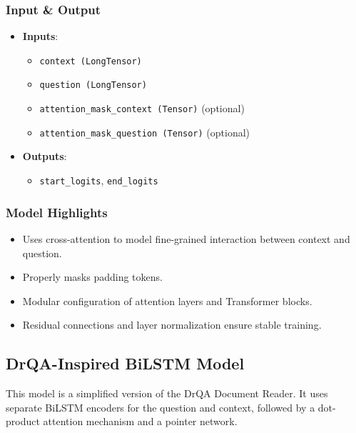 \documentclass[runningheads]{llncs}
\begin{document}
\subsubsection{Input \& Output}
\begin{itemize}
    \item \textbf{Inputs}:
    \begin{itemize}
        \item \texttt{context (LongTensor)}
        \item \texttt{question (LongTensor)}
        \item \texttt{attention\_mask\_context (Tensor)} (optional)
        \item \texttt{attention\_mask\_question (Tensor)} (optional)
    \end{itemize}
    \item \textbf{Outputs}:
    \begin{itemize}
        \item \texttt{start\_logits}, \texttt{end\_logits}
    \end{itemize}
\end{itemize}

\subsubsection{Model Highlights}
\begin{itemize}
    \item Uses cross-attention to model fine-grained interaction between context and question.
    \item Properly masks padding tokens.
    \item Modular configuration of attention layers and Transformer blocks.
    \item Residual connections and layer normalization ensure stable training.
\end{itemize}

\subsection{DrQA-Inspired BiLSTM Model} \cite{drqa}

This model is a simplified version of the DrQA Document Reader. It uses separate BiLSTM encoders for the question and context, followed by a dot-product attention mechanism and a pointer network.
\end{document}
